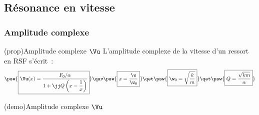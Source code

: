 \documentclass[../../main/main.tex]{subfiles}
\begin{document}

\subsection{Résonance en vitesse}
\subsubsection{Amplitude complexe}
\begin{tcb}(prop){Amplitude complexe $\Vu$}
	L'amplitude complexe de la vitesse d'un ressort en RSF s'écrit~:
	\begin{gather*}
		\psw{
			\boxed{
				\Vu(x) = \frac{F_0/\alpha}{1 + \jj Q \left( x - \dfrac{1}{x} \right)}}
		}
		\qav
		\psw{\boxed{x = \frac{\w}{\w_0}}}
		\qet
		\psw{\boxed{\w_0 = \sqrt{\frac{k}{m}}}}
		\qet
		\psw{\boxed{Q = \frac{\sqrt{km}}{\alpha}}}
	\end{gather*}
	\vspace{-15pt}
\end{tcb}

\begin{tcb*}(demo){Amplitude complexe $\Vu$}
	\vspace{-10pt}
\end{tcb*}
\end{document}
